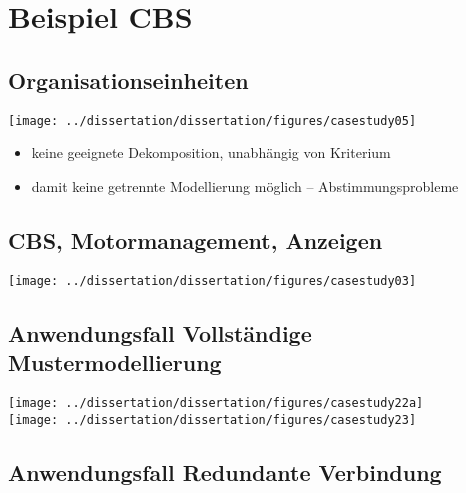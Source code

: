 	\section{Beispiel CBS}

	\subsection{Organisationseinheiten}

	\begin{frame}{\insertsectionhead}{\insertsubsectionhead}
		\hfil\texttt{[image: ../dissertation/dissertation/figures/casestudy05]}\hfil
	\end{frame}

	\begin{itemize}
		\item keine geeignete Dekomposition, unabhängig von Kriterium
		\item damit keine getrennte Modellierung möglich -- Abstimmungsprobleme
	\end{itemize}

	\subsection{CBS, Motormanagement, Anzeigen}

	\begin{frame}{\insertsectionhead}{\insertsubsectionhead}
		\hfil\texttt{[image: ../dissertation/dissertation/figures/casestudy03]}\hfil
	\end{frame}

	\subsection{Anwendungsfall Vollständige Mustermodellierung}

	\begin{frame}{\insertsectionhead}{\insertsubsectionhead}
		\hfil\texttt{[image: ../dissertation/dissertation/figures/casestudy22a]}\hfil\\[.1\textheight]
		\hfil\texttt{[image: ../dissertation/dissertation/figures/casestudy23]}\hfil
	\end{frame}

	\subsection{Anwendungsfall Redundante Verbindung}


